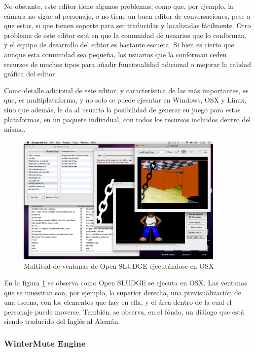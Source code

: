 No obstante, este editor tiene algunos problemas, como que, por ejemplo, la cámara no sigue al personaje, o no tiene un buen editor de conversaciones, pese a que estas, si que tienen soporte para ser traducidas y localizadas fácilmente. Otro problema de este editor está en que la comunidad de usuarios que lo conforman, y el equipo de desarrollo del editor es bastante escueta. Si bien es cierto que aunque esta comunidad sea pequeña, los usuarios que la conforman ceden recursos de muchos tipos para añadir funcionalidad adicional o mejorar la calidad gráfica del editor.

Como detalle adicional de este editor, y característica de las más importantes, es que, es multiplataforma, y no solo se puede ejecutar en Windows, OSX y Linux, sino que además, le da al usuario la posibilidad de generar su juego para estas plataformas, en un paquete individual, con todos los recursos incluidos dentro del mismo.

\begin{figure}[htb]
	\centerline{\includegraphics[height=2.5in]{figures/sludge.png}}
	\caption[Open SLUDGE]{Multitud de ventanas de Open SLUDGE ejecutándose en OSX}
	\label{sludgefigure}
\end{figure}

En la figura \ref{sludgefigure} se observa como Open SLUDGE se ejecuta en OSX. Las ventanas que se muestran son, por ejemplo, la superior derecha, una previsualización de una escena, con los elementos que hay en ella, y el área dentro de la cual el personaje puede moverse. También, se observa, en el fóndo, un diálogo que está siendo traducido del Inglés al Alemán.

\subsubsection{WinterMute Engine}
\label{wintermute}

